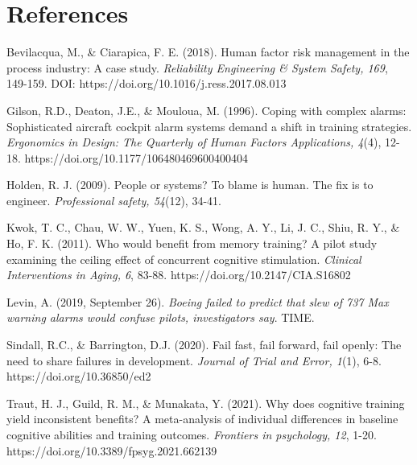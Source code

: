 \documentclass[empirical, author-date]{jote-article}
\begin{document}
\section{References }

Bevilacqua, M., \& Ciarapica, F. E. (2018). Human factor risk management in the process industry: A case study. \emph{Reliability Engineering \& System Safety, 169}, 149-159. DOI: https://doi.org/10.1016/j.ress.2017.08.013



Gilson, R.D., Deaton, J.E., \& Mouloua, M. (1996). Coping with complex alarms: Sophisticated aircraft cockpit alarm systems demand a shift in training strategies. \emph{Ergonomics in Design: The Quarterly of Human Factors Applications, 4}(4), 12-18. https://doi.org/10.1177/106480469600400404



Holden, R. J. (2009). People or systems? To blame is human. The fix is to engineer. \emph{Professional safety, 54}(12), 34-41. 

Kwok, T. C., Chau, W. W., Yuen, K. S., Wong, A. Y., Li, J. C., Shiu, R. Y., \& Ho, F. K. (2011). Who would benefit from memory training? A pilot study examining the ceiling effect of concurrent cognitive stimulation. \emph{Clinical Interventions in Aging, 6}, 83-88. https://doi.org/10.2147/CIA.S16802

Levin, A. (2019, September 26). \emph{Boeing failed to predict that slew of 737 Max warning alarms would confuse pilots, investigators say}. TIME.  

Sindall, R.C., \& Barrington, D.J. (2020). Fail fast, fail forward, fail openly: The need to share failures in development. \emph{Journal of Trial and Error, 1}(1), 6-8. https://doi.org/10.36850/ed2 

Traut, H. J., Guild, R. M., \& Munakata, Y. (2021). Why does cognitive training yield inconsistent benefits? A meta-analysis of individual differences in baseline cognitive abilities and training outcomes.\emph{ Frontiers in psychology, 12}, 1-20. https://doi.org/10.3389/fpsyg.2021.662139
\end{document}
